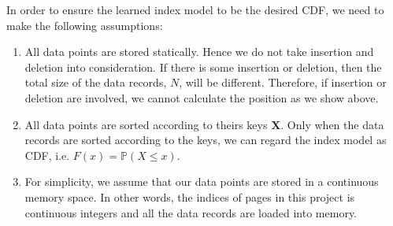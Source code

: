 In order to ensure the learned index model to be the desired CDF, we need to make the following assumptions:

\begin{enumerate}
	\item All data points are stored statically. Hence we do not take insertion and deletion into consideration. If there is some insertion or deletion, then the total size of the data records, $N$, will be different. Therefore, if insertion or deletion are involved, we cannot calculate the position as we show above.
	\item All data points are sorted according to theirs keys $\boldsymbol{X}$. Only when the data records are sorted according to the keys, we can regard the index model as CDF, i.e. $F(x)=\mathbb{P}(X\leq x)$.
	\item For simplicity, we assume that our data points are stored in a continuous memory space. In other words, the indices of pages in this project is continuous integers and all the data records are loaded into memory.
\end{enumerate}